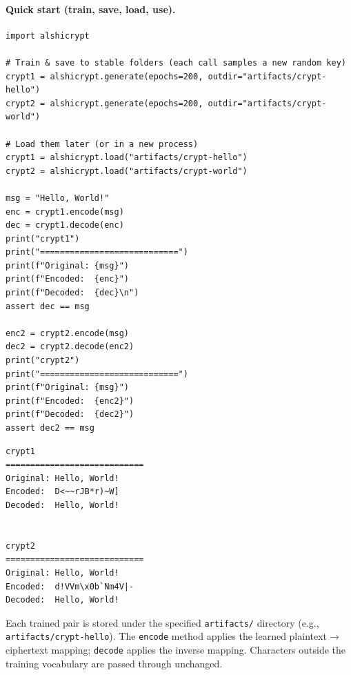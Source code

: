 \documentclass[12pt]{article}
\begin{document}
\paragraph{Quick start (train, save, load, use).}
\begin{verbatim}
import alshicrypt

# Train & save to stable folders (each call samples a new random key)
crypt1 = alshicrypt.generate(epochs=200, outdir="artifacts/crypt-hello")
crypt2 = alshicrypt.generate(epochs=200, outdir="artifacts/crypt-world")

# Load them later (or in a new process)
crypt1 = alshicrypt.load("artifacts/crypt-hello")
crypt2 = alshicrypt.load("artifacts/crypt-world")

msg = "Hello, World!"
enc = crypt1.encode(msg)
dec = crypt1.decode(enc)
print("crypt1")
print("============================")
print(f"Original: {msg}")
print(f"Encoded:  {enc}")
print(f"Decoded:  {dec}\n")
assert dec == msg

enc2 = crypt2.encode(msg)
dec2 = crypt2.decode(enc2)
print("crypt2")
print("============================")
print(f"Original: {msg}")
print(f"Encoded:  {enc2}")
print(f"Decoded:  {dec2}")
assert dec2 == msg
\end{verbatim}

\begin{verbatim}
crypt1
============================
Original: Hello, World!
Encoded:  D<~~rJB*r)~W]
Decoded:  Hello, World!


crypt2
============================
Original: Hello, World!
Encoded:  d!VVm\x0b`Nm4V|-
Decoded:  Hello, World!
\end{verbatim}
\noindent Each trained pair is stored under the specified \texttt{artifacts/} directory
(e.g., \texttt{artifacts/crypt-hello}). The \texttt{encode} method applies the learned
plaintext$\rightarrow$ciphertext mapping; \texttt{decode} applies the inverse mapping.
Characters outside the training vocabulary are passed through unchanged.
\end{document}
